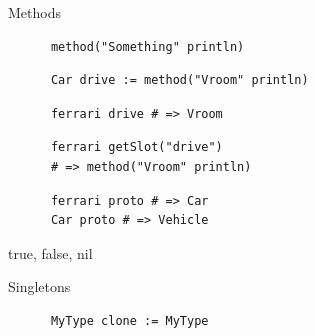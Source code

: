 \begin{frame}
  \begin{center}
    Methods
  \end{center}
\end{frame}

\begin{frame}[fragile]
  \begin{center}
    \begin{lstlisting}
      method("Something" println)
    \end{lstlisting}
  \end{center}
\end{frame}

\begin{frame}[fragile]
  \begin{center}
    \begin{lstlisting}
      Car drive := method("Vroom" println)
    \end{lstlisting}
    \begin{lstlisting}
      ferrari drive # => Vroom
    \end{lstlisting}
  \end{center}
\end{frame}  
  
\begin{frame}[fragile]
  \begin{center}
    \begin{lstlisting}
      ferrari getSlot("drive") 
      # => method("Vroom" println)
    \end{lstlisting}
  \end{center}
\end{frame}  
  
\begin{frame}[fragile]
  \begin{center}
    \begin{lstlisting}
      ferrari proto # => Car
      Car proto # => Vehicle
    \end{lstlisting}
  \end{center}
\end{frame}  

\begin{frame}
  \begin{center}
    true, false, nil
  \end{center}
\end{frame}
  
\begin{frame}[fragile]
  \begin{center}
    Singletons
    \vskip15pt
    
    \begin{lstlisting}
      MyType clone := MyType
    \end{lstlisting}
  \end{center}
\end{frame}
  
